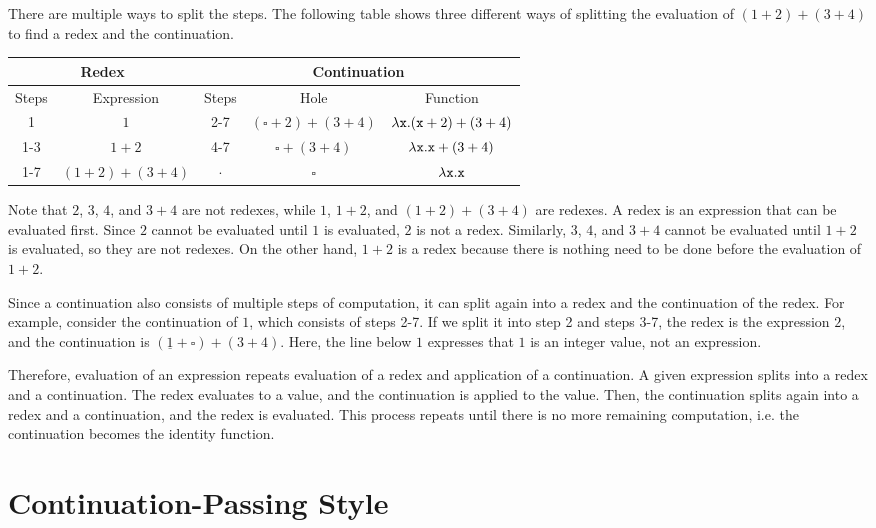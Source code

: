There are multiple ways to split the steps. The following table shows
three different ways of splitting the evaluation of $(1+2)+(3+4)$ to find a redex and the
continuation.

\begin{tabular}{|c|@{~}c|c|@{~}c@{~}|@{~}c@{~}|}
  \hline
  \multicolumn{2}{|c|}{Redex}&\multicolumn{3}{c|}{Continuation} \\
  \hline
  Steps & Expression & Steps & Hole & Function \\
  \hline
  \hline
  1 & $1$ & 2-7 & $(\square+2)+(3+4)$ & $\lambda\texttt{x}.(\texttt{x}+2)+(3+4)$ \\
  \hline
  1-3 & $1+2$ & 4-7 & $\square+(3+4)$ & $\lambda\texttt{x}.\texttt{x}+(3+4)$ \\
  \hline
  1-7 & $(1+2)+(3+4)$ & $\cdot$ & $\square$ & $\lambda\texttt{x}.\texttt{x}$ \\
  \hline
\end{tabular}

Note that $2$, $3$, $4$, and $3+4$ are not redexes, while $1$, $1+2$,
and $(1+2)+(3+4)$ are redexes. A redex is an expression that can be evaluated first.
Since $2$ cannot be evaluated until $1$ is evaluated, $2$ is not a redex.
Similarly, $3$, $4$, and $3+4$ cannot be evaluated until $1+2$ is evaluated, so
they are not redexes. On the other hand, $1+2$ is a redex because there is
nothing need to be done before the evaluation of $1+2$.

Since a continuation also consists of multiple steps of computation, it can
split again into a redex and the continuation of the redex. For example,
consider the continuation of $1$, which consists of steps 2-7.
If we split it into step 2 and steps 3-7, the redex is the expression
$2$, and the continuation is $(\underline{1}+\square)+(3+4)$. Here, the
line below $1$ expresses that $1$ is an integer value, not an expression.

Therefore, evaluation of an expression repeats evaluation of a redex and
application of a continuation. A given expression splits into a redex and a
continuation. The redex evaluates to a value, and the continuation is applied
to the value. Then, the continuation splits again into a redex and a
continuation, and the redex is evaluated. This process repeats until there is no
more remaining computation, i.e. the continuation becomes the identity function.

\section{Continuation-Passing Style}

